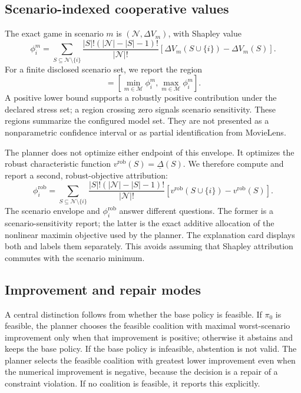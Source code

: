 \documentclass[pdflatex,sn-mathphys-num]{sn-jnl}
\theoremstyle{thmstyleone}
\theoremstyle{thmstyletwo}
\theoremstyle{thmstylethree}
\newcommand{\Players}{\mathcal{N}}
\newcommand{\Models}{\mathcal{M}}
\newcommand{\BasePolicy}{\pi_0}
\newcommand{\Utility}{V}
\newcommand{\Shap}{\phi}
\begin{document}
\subsection{Scenario-indexed cooperative values}

The exact game in scenario $m$ is $(\Players,\Delta\Utility_m)$, with Shapley value
\begin{equation}
 \Shap_i^m=\sum_{S\subseteq\Players\setminus\{i\}}\frac{|S|!(|\Players|-|S|-1)!}{|\Players|!}\left[\Delta\Utility_m(S\cup\{i\})-\Delta\Utility_m(S)\right].
\label{eq:shapley}
\end{equation}
For a finite disclosed scenario set, we report the region
\begin{equation}
 [\underline{\Shap}_i,\overline{\Shap}_i]=\left[\min_{m\in\Models}\Shap_i^m,\max_{m\in\Models}\Shap_i^m\right].
\label{eq:region}
\end{equation}
A positive lower bound supports a robustly positive contribution under the declared stress set; a region crossing zero signals scenario sensitivity. These regions summarize the configured model set. They are not presented as a nonparametric confidence interval or as partial identification from MovieLens.

The planner does not optimize either endpoint of this envelope. It optimizes the robust characteristic function $v^{\mathrm{rob}}(S)=\underline{\Delta}(S)$. We therefore compute and report a second, robust-objective attribution:
\begin{equation}
 \phi_i^{\mathrm{rob}}=\sum_{S\subseteq\Players\setminus\{i\}}\frac{|S|!(|\Players|-|S|-1)!}{|\Players|!}\left[v^{\mathrm{rob}}(S\cup\{i\})-v^{\mathrm{rob}}(S)\right].
\label{eq:robust-shapley}
\end{equation}
The scenario envelope and $\phi_i^{\mathrm{rob}}$ answer different questions. The former is a scenario-sensitivity report; the latter is the exact additive allocation of the nonlinear maximin objective used by the planner. The explanation card displays both and labels them separately. This avoids assuming that Shapley attribution commutes with the scenario minimum.

\subsection{Improvement and repair modes}

A central distinction follows from whether the base policy is feasible. If $\BasePolicy$ is feasible, the planner chooses the feasible coalition with maximal worst-scenario improvement only when that improvement is positive; otherwise it abstains and keeps the base policy. If the base policy is infeasible, abstention is not valid. The planner selects the feasible coalition with greatest lower improvement even when the numerical improvement is negative, because the decision is a repair of a constraint violation. If no coalition is feasible, it reports this explicitly.
\end{document}
